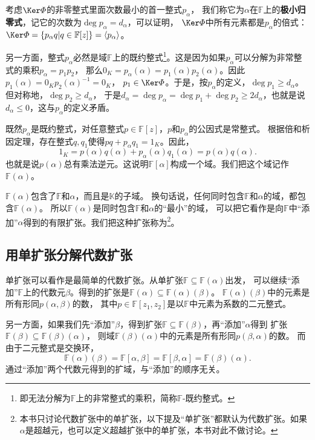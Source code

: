 \documentclass[12pt,UTF8]{ctexbook}
\begin{document}
\begin{appendix}
考虑$\Ker\varPhi$的非零整式里面次数最小的首一整式$p_\alpha$，
我们称它为$\alpha$在$\mathbb{F}$上的\textbf{极小归零式}，记它的次数为$\deg p_\alpha = d_\alpha$，可以证明，
$\Ker\varPhi$中所有元素都是$p_\alpha$的倍式：$\Ker\varPhi = \{p_\alpha q | q \in \mathbb{F}[z]\} = \langle p_\alpha \rangle $。

另一方面，整式$p_\alpha$必然是域$\mathbb{F}$上的既约整式\footnote{即无法分解为$\mathbb{F}$上的非常整式的乘积，简称$\mathbb{F}$-既约整式。}。这是因为如果$p_\alpha$可以分解为非常整式的乘积$p_\alpha = p_1p_2$，
那么$0_K = p_\alpha(\alpha) = p_1(\alpha)p_2(\alpha)$。因此$p_1(\alpha) = 0_K p_2(\alpha)^{-1} = 0_K$，
$p_1\in \Ker\varPhi$。于是，按$p_\alpha$的定义，$\deg p_1 \geqslant d_\alpha$。但对称地，$\deg p_2 \geqslant d_\alpha$，
于是$d_\alpha = \deg p_\alpha = \deg p_1 + \deg p_2 \geqslant 2d_\alpha$，也就是说$d_\alpha \leqslant 0$，这与$p_\alpha$的定义矛盾。

既然$p_\alpha$是既约整式，对任意整式$p \in\mathbb{F}[z]$，$p$和$p_\alpha$的公因式是常整式。
根据倍和析因定理，存在整式$q, q_1$使得$pq + p_\alpha q_1 = 1_K$。因此，
$$1_K = p(\alpha)q(\alpha) + p_\alpha(\alpha)q_1(\alpha) = p(\alpha)q(\alpha).$$
也就是说$p(\alpha)$总有乘法逆元。这说明$\mathbb{F}[\alpha]$构成一个域。我们把这个域记作$\mathbb{F}(\alpha)$。

$\mathbb{F}(\alpha)$包含了$\mathbb{F}$和$\alpha$，而且是$\mathbb{K}$的子域。
换句话说，任何同时包含$\mathbb{F}$和$\alpha$的域，都包含$\mathbb{F}(\alpha)$。
所以$\mathbb{F}(\alpha)$是同时包含$\mathbb{F}$和$\alpha$的“最小”的域，
可以把它看作是向$\mathbb{F}$中“添加”$\alpha$得到的有限扩张。我们把这种扩张称为\footnote{本书只讨论代数扩张中的单扩张，以下提及“单扩张”都默认为代数扩张。如果$\alpha$是超越元，也可以定义超越扩张中的单扩张，本书对此不做讨论。}。

\subsection{用单扩张分解代数扩张}
单扩张可以看作是最简单的代数扩张。从单扩张$\mathbb{F} \subseteq \mathbb{F}(\alpha)$出发，
可以继续“添加”$\mathbb{F}$上的代数元$\beta$。得到的扩张是$\mathbb{F}(\alpha) \subseteq \mathbb{F}(\alpha)(\beta)$。
$\mathbb{F}(\alpha)(\beta)$中的元素是所有形同$p(\alpha, \beta)$的数，
其中$p\in \mathbb{F}[z_1, z_2]$是以$\mathbb{F}$中元素为系数的二元整式。

另一方面，如果我们先“添加”$\beta$，得到扩张$\mathbb{F} \subseteq \mathbb{F}(\beta)$，再“添加”$\alpha$得到
扩张$\mathbb{F}(\beta) \subseteq \mathbb{F}(\beta)(\alpha)$，
则域$\mathbb{F}(\beta)(\alpha)$中的元素是所有形同$p(\beta, \alpha)$的数。
而由于二元整式是交换环，
$$\mathbb{F}(\alpha)(\beta) = \mathbb{F}[\alpha, \beta] = \mathbb{F}[\beta, \alpha] = \mathbb{F}(\beta)(\alpha).$$
通过“添加”两个代数元得到的扩域，与“添加”的顺序无关。


\end{appendix}
\end{document}
